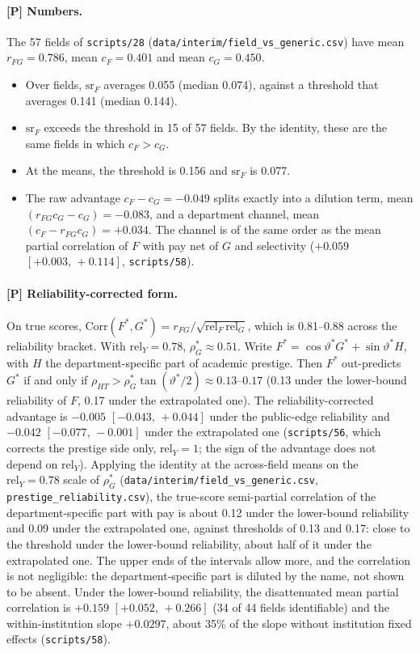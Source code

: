 \documentclass[11pt]{article}
\newcommand{\ci}[2]{$[#1,\allowbreak\,#2]$}
\begin{document}
\paragraph{[P] Numbers.} The 57 fields of \texttt{scripts/28} (\texttt{data/interim/field\_vs\_generic.csv})
have mean $r_{FG}=0.786$, mean $c_F=0.401$ and mean $c_G=0.450$.
\begin{itemize}
\item Over fields, $\mathrm{sr}_F$ averages 0.055 (median 0.074), against a threshold that averages 0.141 (median
0.144).
\item $\mathrm{sr}_F$ exceeds the threshold in 15 of 57 fields. By the identity, these are the same fields in which
$c_F>c_G$.
\item At the means, the threshold is 0.156 and $\mathrm{sr}_F$ is 0.077.
\item The raw advantage $c_F-c_G=-0.049$ splits exactly into a dilution term, mean $(r_{FG}c_G-c_G)=-0.083$, and a
department channel, mean $(c_F-r_{FG}c_G)=+0.034$. The channel is of the same order as the mean partial
correlation of $F$ with pay net of $G$ and selectivity ($+0.059$ \ci{+0.003}{+0.114}, \texttt{scripts/58}).
\end{itemize}

\paragraph{[P] Reliability-corrected form.} On true scores,
$\mathrm{Corr}(F^*,G^*)=r_{FG}/\sqrt{\mathrm{rel}_F\,\mathrm{rel}_G}$, which is 0.81--0.88 across the reliability
bracket. With $\mathrm{rel}_Y=0.78$, $\rho^*_G\approx0.51$. Write $F^*=\cos\vartheta^*G^*+\sin\vartheta^*H$, with $H$
the department-specific part of academic prestige. Then $F^*$ out-predicts $G^*$ if and only if
$\rho_{HT}>\rho^*_G\tan(\vartheta^*/2)\approx0.13$--$0.17$ (0.13 under the lower-bound reliability of $F$, 0.17
under the extrapolated one). The reliability-corrected advantage is $-0.005$ \ci{-0.043}{+0.044} under the
public-edge reliability and $-0.042$ \ci{-0.077}{-0.001} under the extrapolated one (\texttt{scripts/56}, which
corrects the prestige side only, $\mathrm{rel}_Y=1$; the sign of the advantage does not depend on $\mathrm{rel}_Y$).
Applying the identity at the across-field means on the $\mathrm{rel}_Y=0.78$ scale of $\rho^*_G$
(\texttt{data/interim/field\_vs\_generic.csv}, \texttt{prestige\_reliability.csv}), the true-score semi-partial
correlation of the department-specific part with pay is about 0.12 under the lower-bound reliability and 0.09 under
the extrapolated one, against thresholds of 0.13 and 0.17: close to the threshold under the lower-bound
reliability, about half of it under the extrapolated one. The upper ends of the intervals allow more, and the
correlation is not negligible: the department-specific part is diluted by the name, not shown to be absent. Under
the lower-bound reliability, the disattenuated mean partial correlation is $+0.159$ \ci{+0.052}{+0.266} (34 of 44
fields identifiable) and the within-institution slope $+0.0297$, about 35\% of the slope without institution fixed
effects (\texttt{scripts/58}).
\end{document}

